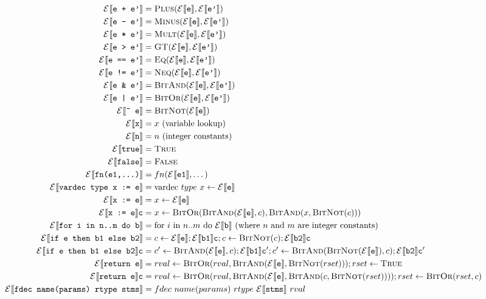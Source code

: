 
\usepackage{semantic}
\usepackage{textcomp}

\newcommand\bigstep{\ensuremath\Longrightarrow}

\newcommand\band{\textsc{BitAnd}}
\newcommand\bor{\textsc{BitOr}}
\newcommand\bnot{\textsc{BitNot}}
\newcommand\btrue{\textsc{True}}
\newcommand\bfalse{\textsc{False}}



\begin{align*}
\eval{e + e'}{} &= \textsc{Plus}(\eval{e}{}, \eval{e'}{}) \\
\eval{e - e'}{} &= \textsc{Minus}(\eval{e}{}, \eval{e'}{}) \\
\eval{e * e'}{} &= \textsc{Mult}(\eval{e}{}, \eval{e'}{}) \\
\eval{e > e'}{} &= \textsc{GT}(\eval{e}{}, \eval{e'}{}) \\
\eval{e == e'}{} &= \textsc{Eq}(\eval{e}{}, \eval{e'}{}) \\
\eval{e != e'}{} &= \textsc{Neq}(\eval{e}{}, \eval{e'}{}) \\
\eval{e \& e'}{} &= \band(\eval{e}{}, \eval{e'}{}) \\
\eval{e | e'}{} &= \bor(\eval{e}{}, \eval{e'}{}) \\
\eval{\~{} e}{} &= \bnot(\eval{e}{}) \\
\eval{x}{} &= x \text{ (variable lookup)} \\
\eval{n}{} &= n \text{ (integer constants)} \\
\eval{true}{} &= \btrue \\
\eval{false}{} &= \bfalse \\
\eval{fn(e1,...)}{} &= fn(\eval{e1}{},\dots) \\
\eval{vardec type x := e}{} &= \text{vardec}~type~x \gets \eval{e}{} \\
\eval{x := e}{} &= x \gets \eval{e}{} \\
\eval{x := e}{c} &= x \gets \bor(\band(\eval{e}{}, c), \band(x, \bnot(c))) \\
\eval{for i in n..m do b}{} &= \text{for}~i~\text{in}~n..m~\text{do}~\eval{b}{} \text{ (where $n$ and $m$ are integer constants)} \\
\eval{if e then b1 else b2}{} &= c \gets \eval{e}{}; \eval{b1}{c}; c \gets \bnot(c); \eval{b2}{c} \\
\eval{if e then b1 else b2}{c} &= c' \gets \band(\eval{e}{}, c); \eval{b1}{c'}; c' \gets \band(\bnot(\eval{e}{}), c); \eval{b2}{c'} \\
\eval{return e}{} &= rval \gets \bor(rval, \band(\eval{e}{}, \bnot(rset))); rset \gets \btrue \\
\eval{return e}{c} &= rval \gets \bor(rval, \band(\eval{e}{}, \band(c, \bnot(rset)))); rset \gets \bor(rset, c) \\
\eval{fdec name(params) rtype stms}{} &= fdec~name(params)~rtype~\eval{stms}{}~rval \\
\end{align*}

